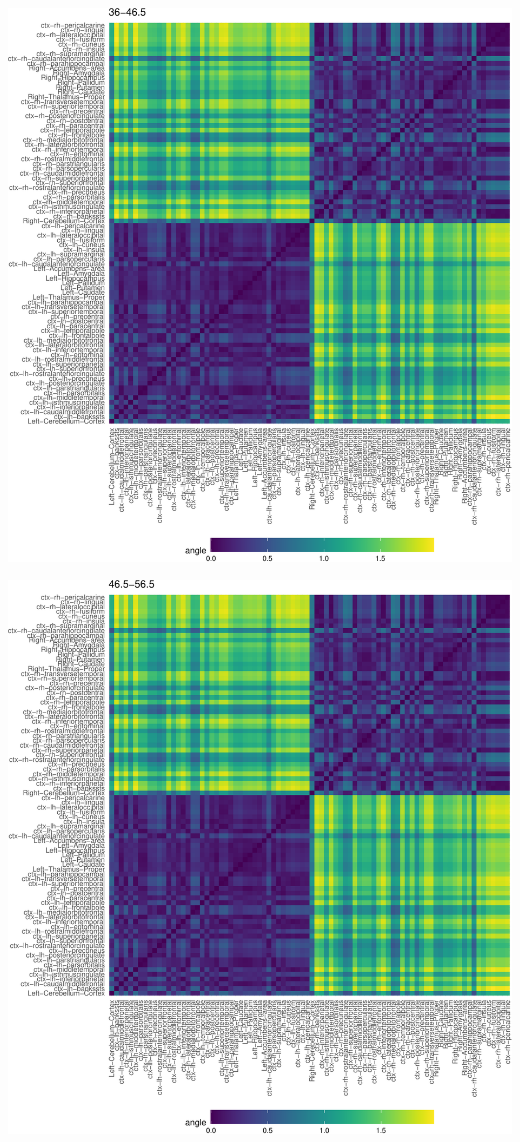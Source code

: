 \documentclass[12pt]{article}
\begin{document}
\begin{center}\includegraphics[width=1\linewidth]{draft_files/figure-latex/cosine-heatmap-2-1} \end{center}

\begin{center}\includegraphics[width=1\linewidth]{draft_files/figure-latex/cosine-heatmap-2-2} \end{center}
\end{document}
